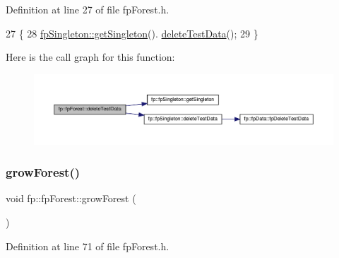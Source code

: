 Definition at line 27 of file fp\+Forest.\+h.


\begin{DoxyCode}
27                                  \{
28                 \hyperlink{classfp_1_1fpSingleton_a8bdae77b68521003e3fc630edec2e240}{fpSingleton::getSingleton}().
      \hyperlink{classfp_1_1fpSingleton_aa4ac02c580b06ba16ed0160ec694438d}{deleteTestData}();
29             \}
\end{DoxyCode}
Here is the call graph for this function\+:\nopagebreak
\begin{figure}[H]
\begin{center}
\leavevmode
\includegraphics[width=350pt]{classfp_1_1fpForest_a3eb78e4e61b289853cc45021f2cf3de0_cgraph}
\end{center}
\end{figure}
\mbox{\label{classfp_1_1fpForest_ac617e33890e96ee5e96e286a45d245fe}} 
\subsubsection{\texorpdfstring{grow\+Forest()}{growForest()}}
{\footnotesize\ttfamily void fp\+::fp\+Forest\+::grow\+Forest (\begin{DoxyParamCaption}{ }\end{DoxyParamCaption})\hspace{0.3cm}{\ttfamily [inline]}}



Definition at line 71 of file fp\+Forest.\+h.


